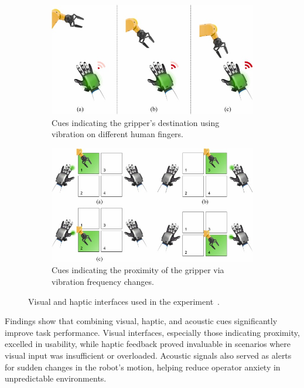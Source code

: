 \begin{figure}[htp]
    \centering
    \begin{subfigure}{\textwidth}
        \centering
        \includegraphics[width=0.6\linewidth]{figs/haptic-cues.jpg}
        \caption{Cues indicating the gripper’s destination using vibration on different human fingers.}
        \label{fig:sfig1}
    \end{subfigure}

    \vspace{0.5cm} %
    
    \begin{subfigure}{\textwidth}
        \centering
        \includegraphics[width=0.6\linewidth]{figs/visual-cues.jpg}
        \caption{Cues indicating the proximity of the gripper via vibration frequency changes.}
        \label{fig:sfig2}
    \end{subfigure}
    
    \caption{Visual and haptic interfaces used in the experiment~\cite{CHU2023313}.}
    \label{fig:haptic-visual-cues}
\end{figure}


Findings show that combining visual, haptic, and acoustic cues significantly improve task performance. Visual interfaces, especially those indicating proximity, excelled in usability, while haptic feedback proved invaluable in scenarios where visual input was insufficient or overloaded. Acoustic signals also served as alerts for sudden changes in the robot's motion, helping reduce operator anxiety in unpredictable environments.

